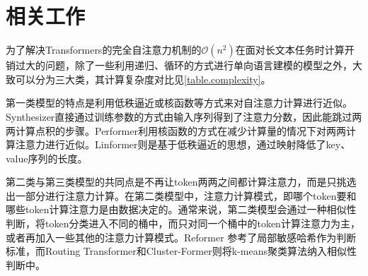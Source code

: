 \chapter{相关工作}

\begin{table}[b]
\caption{部分相关模型的复杂度}
\label{table.complexity}
\begin{center}
\end{center}
\end{table}

为了解决Transformers的完全自注意力机制的$\mathcal{O}(n^2)$在面对长文本任务时计算开销过大的问题，除了一些利用递归、循环的方式进行单向语言建模的模型之外，大致可以分为三大类，其计算复杂度对比见\autoref{table.complexity}。

第一类模型的特点是利用低秩逼近或核函数等方式来对自注意力计算进行近似。Synthesizer\cite{tay2020synthesizer}直接通过训练参数的方式由输入序列得到了注意力分数，因此能跳过两两计算点积的步骤。Performer\cite{choromanski2020rethinking}利用核函数的方式在减少计算量的情况下对两两计算注意力进行近似。Linformer\cite{wang2020linformer}则是基于低秩逼近的思想，通过映射降低了key、value序列的长度。

第二类与第三类模型的共同点是不再让token两两之间都计算注意力，而是只挑选出一部分进行注意力计算。在第二类模型中，注意力计算模式，即哪个token要和哪些token计算注意力是由数据决定的。通常来说，第二类模型会通过一种相似性判断，将token分类进入不同的桶中，而只对同一个桶中的token计算注意力为主，或者再加入一些其他的注意力计算模式。Reformer\cite{kitaev2020reformer} 参考了局部敏感哈希作为判断标准，而Routing Transformer\cite{roy2021efficient}和Cluster-Former\cite{wang2020cluster}则将k-means聚类算法纳入相似性判断中。

